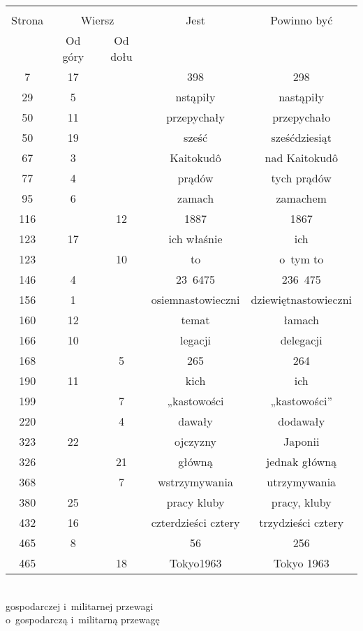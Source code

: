 \documentclass[a4paper,11pt]{article}
\begin{document}
\newpage
{}
\begin{center}

  \begin{tabular}{|c|c|c|c|c|}
    \hline
    & \multicolumn{2}{c|}{} & & \\
    Strona & \multicolumn{2}{c|}{Wiersz} & Jest
                              & Powinno być \\ \cline{2-3}
    & Od góry & Od dołu & & \\
    \hline
    7   & 17 & & 398 & 298 \\
    29  &  5 & & nstąpiły & nastąpiły \\
    50  & 11 & & przepychały & przepychało \\
    50  & 19 & & sześć & sześćdziesiąt \\
    67  &  3 & & Kaitokud\^{o} & nad Kaitokud\^{o} \\
    77  &  4 & & prądów & tych prądów \\
    95  &  6 & & zamach & zamachem \\
    116 & & 12 & 1887 & 1867 \\
    123 & 17 & & ich właśnie & ich \\
    123 & & 10 & to & o~tym to \\
    146 &  4 & & 23~6475 & 236~475 \\
    156 &  1 & & osiemnastowieczni & dziewiętnastowieczni \\
    160 & 12 & & temat & łamach \\
    166 & 10 & & legacji & delegacji \\
    168 & & 5 & 265 & 264 \\
    190 & 11 & & kich & ich \\
    199 & & 7 & „kastowości & „kastowości” \\
    220 & &  4 & dawały & dodawały \\
    323 & 22 & & ojczyzny & Japonii \\
    326 & & 21 & główną & jednak główną \\
    368 & &  7 & wstrzymywania & utrzymywania \\
    380 & 25 & & pracy kluby & pracy, kluby \\
    432 & 16 & & czterdzieści cztery & trzydzieści cztery \\
    465 &  8 & & 56 & 256 \\
    465 & & 18 & Tokyo1963 & Tokyo 1963 \\
    \hline
  \end{tabular}

\end{center}
\noi
{} \\
\Jest  gospodarczej i~militarnej przewagi \\
\Powin o~gospodarczą i~militarną przewagę \\
\end{document}
